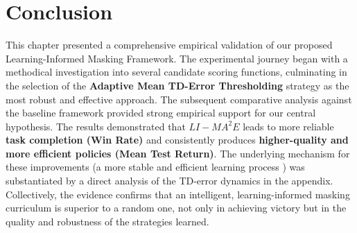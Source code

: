 \section*{Conclusion}

This chapter presented a comprehensive empirical validation of our proposed Learning-Informed Masking Framework. The experimental journey began with a methodical investigation into several candidate scoring functions, culminating in the selection of the \textbf{Adaptive Mean TD-Error Thresholding} strategy as the most robust and effective approach. The subsequent comparative analysis against the baseline framework provided strong empirical support for our central hypothesis. The results demonstrated that  $LI-{MA}^2E$ leads to more reliable \textbf{task completion (Win Rate)} and consistently produces \textbf{higher-quality and more efficient policies (Mean Test Return)}. The underlying mechanism for these improvements (a more stable and efficient learning process ) was substantiated by a direct analysis of the TD-error dynamics in the appendix. Collectively, the evidence confirms that an intelligent, learning-informed masking curriculum is superior to a random one, not only in achieving victory but in the quality and robustness of the strategies learned.





